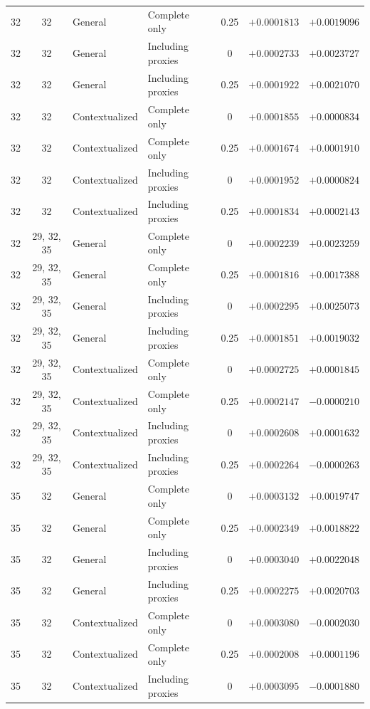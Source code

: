 \begin{table}[p]
\begin{tabular*}{\textwidth}{@{\extracolsep{\fill}}ccllcrr@{}}
32 & 32 & General & Complete only & 0.25 & $+0.0001813$ & $+0.0019096$ \\
32 & 32 & General & Including proxies & 0 & $+0.0002733$ & $+0.0023727$ \\
32 & 32 & General & Including proxies & 0.25 & $+0.0001922$ & $+0.0021070$ \\
32 & 32 & Contextualized & Complete only & 0 & $+0.0001855$ & $+0.0000834$ \\
32 & 32 & Contextualized & Complete only & 0.25 & $+0.0001674$ & $+0.0001910$ \\
32 & 32 & Contextualized & Including proxies & 0 & $+0.0001952$ & $+0.0000824$ \\
32 & 32 & Contextualized & Including proxies & 0.25 & $+0.0001834$ & $+0.0002143$ \\
32 & 29, 32, 35 & General & Complete only & 0 & $+0.0002239$ & $+0.0023259$ \\
32 & 29, 32, 35 & General & Complete only & 0.25 & $+0.0001816$ & $+0.0017388$ \\
32 & 29, 32, 35 & General & Including proxies & 0 & $+0.0002295$ & $+0.0025073$ \\
32 & 29, 32, 35 & General & Including proxies & 0.25 & $+0.0001851$ & $+0.0019032$ \\
32 & 29, 32, 35 & Contextualized & Complete only & 0 & $+0.0002725$ & $+0.0001845$ \\
32 & 29, 32, 35 & Contextualized & Complete only & 0.25 & $+0.0002147$ & $-0.0000210$ \\
32 & 29, 32, 35 & Contextualized & Including proxies & 0 & $+0.0002608$ & $+0.0001632$ \\
32 & 29, 32, 35 & Contextualized & Including proxies & 0.25 & $+0.0002264$ & $-0.0000263$ \\
\midrule
35 & 32 & General & Complete only & 0 & $+0.0003132$ & $+0.0019747$ \\
35 & 32 & General & Complete only & 0.25 & $+0.0002349$ & $+0.0018822$ \\
35 & 32 & General & Including proxies & 0 & $+0.0003040$ & $+0.0022048$ \\
35 & 32 & General & Including proxies & 0.25 & $+0.0002275$ & $+0.0020703$ \\
35 & 32 & Contextualized & Complete only & 0 & $+0.0003080$ & $-0.0002030$ \\
35 & 32 & Contextualized & Complete only & 0.25 & $+0.0002008$ & $+0.0001196$ \\
35 & 32 & Contextualized & Including proxies & 0 & $+0.0003095$ & $-0.0001880$ \\

\end{tabular*}
\end{table}
